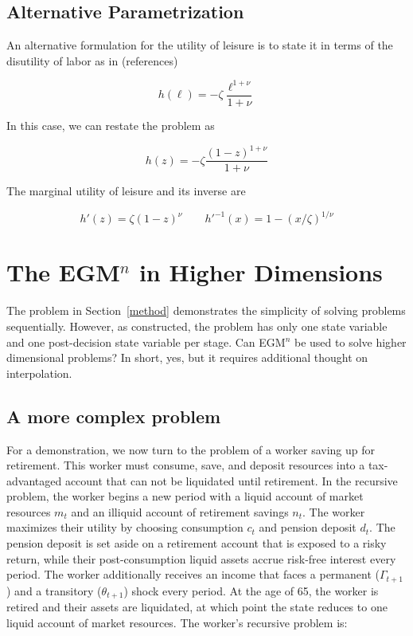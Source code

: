 \documentclass{article}
\newcommand{\tShkEmp}{\theta}
\newcommand{\labShare}{\nu}
\newcommand{\leiShare}{\zeta}
\newcommand{\h}{h}
\newcommand{\leisure}{z}
\newcommand{\cRat}{c}
\newcommand{\PGro}{\Gamma}
\newcommand{\labor}{\ell}
\newcommand{\mRat}{m}
\newcommand{\xRat}{x}
\newcommand{\nRat}{n}
\newcommand{\dRat}{d}
\begin{document}

\subsection{Alternative Parametrization}\label{Alternative Parametrization}

An alternative formulation for the utility of leisure is to state it in terms
of the disutility of labor as in (references)

\begin{equation}
\h(\labor) = - \leiShare \frac{\labor^{1+\labShare}}{1+\labShare}
\end{equation}

In this case, we can restate the problem as

\begin{equation}
\h(\leisure) = - \leiShare
  \frac{(1-\leisure)^{1+\labShare}}{1+\labShare}
\end{equation}

The marginal utility of leisure and its inverse are

\begin{equation}
\h'(\leisure) = \leiShare(1-\leisure)^{\labShare} \qquad
  \h'^{-1}(\xRat) = 1 - (\xRat/\leiShare)^{1/\labShare}
\end{equation}

\section{The EGM$^n$ in Higher Dimensions}\label{multdim}

The problem in Section~\ref{method} demonstrates the simplicity of solving problems sequentially. However, as constructed, the problem has only one state variable and one post-decision state variable per stage. Can EGM$^n$ be used to solve higher dimensional problems? In short, yes, but it requires additional thought on interpolation.

\subsection{A more complex problem}\label{A more complex problem}

For a demonstration, we now turn to the problem of a worker saving up for retirement. This worker must consume, save, and deposit resources into a tax-advantaged account that can not be liquidated until retirement. In the recursive problem, the worker begins a new period with a liquid account of market resources $\mRat_{t}$ and an illiquid account of retirement savings $\nRat_{t}$. The worker maximizes their utility by choosing consumption $\cRat_{t}$ and pension deposit $\dRat_{t}$. The pension deposit is set aside on a retirement account that is exposed to a risky return, while their post-consumption liquid assets accrue risk-free interest every period. The worker additionally receives an income that faces a permanent ($\PGro_{t+1}$) and a transitory ($\tShkEmp_{t+1}$) shock every period. At the age of 65, the worker is retired and their assets are liquidated, at which point the state reduces to one liquid account of market resources. The worker's recursive problem is:
\end{document}
